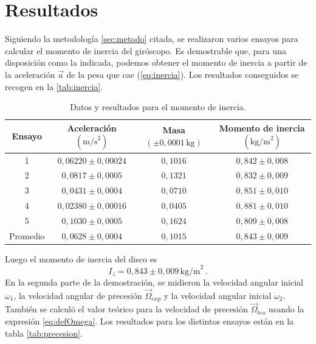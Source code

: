 \documentclass[a4paper]{article}
\begin{document}
\section{Resultados} \label{sec:resultados}
Siguiendo la metodología \ref{sec:metodo} citada, se realizaron varios ensayos para calcular el momento de inercia del giróscopo. Es demostrable que, para una disposición como la indicada, podemos obtener el momento de inercia a partir de la aceleración $\vec{a}$ de la pesa que cae (\autoref{eq:inercia}). Los resultados conseguidos se recogen en la \autoref{tab:inercia}.
\begin{table}[h]
\begin{center}
\begin{tabular}{|c|c|c|c|}
\hline
Ensayo & Aceleración $\left(\text{m/s}^2\right)$ & Masa $\left(\pm 0,0001\,\text{kg}\right)$ & Momento de inercia $\left(\text{kg/m}^2\right)$\\
\hline
1 & $0,06220\pm 0,00024$ & $0,1016$ & $0,842\pm 0,008$\\
\hline
2 & $0,0817\pm 0,0005$ & $0,1321$ & $0,832\pm 0,009$\\
\hline
3 & $0,0431\pm 0,0004$ & $0,0710$ & $0,851\pm 0,010$\\
\hline
4 & $0,02380\pm 0,00016$ & $0,0405$ & $0,881\pm 0,010$\\
\hline
5 & $0,1030\pm 0,0005$ & $0,1624$ & $0,809\pm 0,008$\\
\hline
Promedio & $0,0628\pm 0,0004$ & $0,1015$ & $0,843\pm 0,009$\\
\hline
\end{tabular}
\caption{Datos y resultados para el momento de inercia.}
\label{tab:inercia}
\end{center}
\end{table}
Luego el momento de inercia del disco es 
\begin{equation}
I_z=0,843\pm 0,009\,\text{kg/m}^2\,.
\end{equation}
En la segunda parte de la demostración, se midieron la velocidad angular inicial $\omega_1$, la velocidad angular de precesión $\vec{\Omega}_{exp}$ y la velocidad angular inicial $\omega_2$. También se calculó el valor teórico para la velocidad de precesión $\vec{\Omega}_{teo}$ usando la expresión \eqref{eq:defOmega}. Los resultados para los distintos ensayos están en la tabla \autoref{tab:precesion}.
\end{document}
